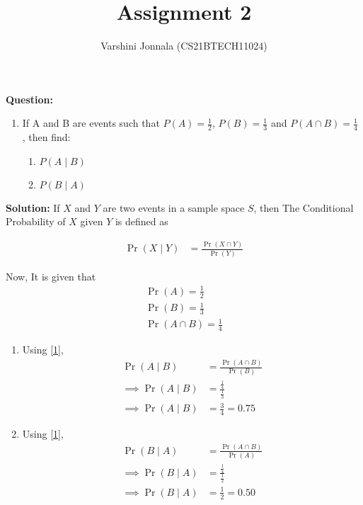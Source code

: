 \documentclass[journal,12pt,twocolumn]{IEEEtran}
\title{Assignment 2}
\author{Varshini Jonnala (CS21BTECH11024)}
\providecommand{\pr}[1]{\ensuremath{\Pr\left(#1\right)}}
\newcommand{\question}{\noindent \textbf{Question: }}
\newcommand{\solution}{\noindent \textbf{Solution: }}
\begin{document}
    \maketitle
    
    \question
    \begin{enumerate}[label=]
        \item  If A and B are events such that $P(A) = \frac{1}{2}$, $P(B)= \frac{1}{3}$ and $P(A \cap B)= \frac{1}{4}$ , then find:
    \begin{enumerate}
        \item $P(A \mid B)$
        \item $P(B \mid A)$
    \end{enumerate}
    \end{enumerate}

    \solution 
     If $X$ and $Y$ are two events in a sample space $S$,
     then The Conditional Probability of $X$ given $Y$ is defined as
     
        \begin{align}
          \label{1}   \pr{X \mid Y} &= \frac{\pr{X \cap Y}}{\pr{Y}}
        \end{align}
        
        Now, It is given that
        \begin{align}
            \pr{A} = \frac{1}{2}\\
            \pr{B} = \frac{1}{3}\\
            \pr{A \cap B} = \frac{1}{4}
        \end{align}
        
        \begin{enumerate}
            \item Using \eqref{1},
            \begin{align}
                \pr{A \mid B} &= \frac{\pr{A \cap B}}{\pr{B}}\\
                \implies \pr{A \mid B} &= {\frac{\frac{1}{4}}{\frac{1}{3}}}\\
                \implies \pr{A \mid B} &= \frac{3}{4} = 0.75
            \end{align}
            
            \item Using \eqref{1},
                \begin{align}
                \pr{B \mid A} &= \frac{\pr{A \cap B}}{\pr{A}}\\
                \implies \pr{B \mid A} &= {\frac{\frac{1}{4}}{\frac{1}{2}}}\\
                \implies \pr{B \mid A} &= \frac{1}{2} = 0.50
            \end{align} 
        \end{enumerate}
    
\end{document}
